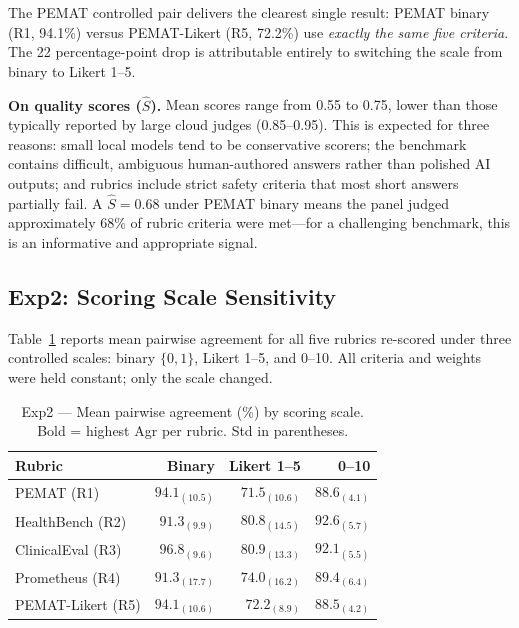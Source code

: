 \documentclass[conference]{IEEEtran}
\begin{document}
The PEMAT controlled pair delivers the clearest single result: PEMAT
binary (R1, 94.1\%) versus PEMAT-Likert (R5, 72.2\%) use \emph{exactly
the same five criteria}. The 22 percentage-point drop is attributable
entirely to switching the scale from binary to Likert 1--5.

\textbf{On quality scores ($\hat{S}$).} Mean scores range from 0.55
to 0.75, lower than those typically reported by large cloud judges
(0.85--0.95). This is expected for three reasons: small local models
tend to be conservative scorers; the benchmark contains difficult,
ambiguous human-authored answers rather than polished AI outputs; and
rubrics include strict safety criteria that most short answers partially
fail. A $\hat{S} = 0.68$ under PEMAT binary means the panel judged
approximately 68\% of rubric criteria were met---for a challenging
benchmark, this is an informative and appropriate signal.

\subsection{Exp2: Scoring Scale Sensitivity}

Table~\ref{tab:exp2} reports mean pairwise agreement for all five
rubrics re-scored under three controlled scales: binary $\{0,1\}$,
Likert 1--5, and 0--10. All criteria and weights were held constant;
only the scale changed.

\begin{table}[htbp]
\caption{Exp2 --- Mean pairwise agreement (\%) by scoring scale.
Bold = highest Agr per rubric. Std in parentheses.}
\label{tab:exp2}
\begin{center}
\small
\begin{tabular}{|l|r|r|r|}
\hline
\textbf{Rubric} & \textbf{Binary} & \textbf{Likert 1--5} & \textbf{0--10} \\
\hline
PEMAT (R1)        & $\mathbf{94.1}_{(10.5)}$ & $71.5_{(10.6)}$ & $88.6_{(4.1)}$ \\
HealthBench (R2)  & $91.3_{(9.9)}$           & $80.8_{(14.5)}$ & $\mathbf{92.6}_{(5.7)}$ \\
ClinicalEval (R3) & $\mathbf{96.8}_{(9.6)}$  & $80.9_{(13.3)}$ & $92.1_{(5.5)}$ \\
Prometheus (R4)   & $91.3_{(17.7)}$          & $74.0_{(16.2)}$ & $\mathbf{89.4}_{(6.4)}$ \\
PEMAT-Likert (R5) & $\mathbf{94.1}_{(10.6)}$ & $72.2_{(8.9)}$  & $88.5_{(4.2)}$ \\
\hline
\end{tabular}
\end{center}
\end{table}
\end{document}
